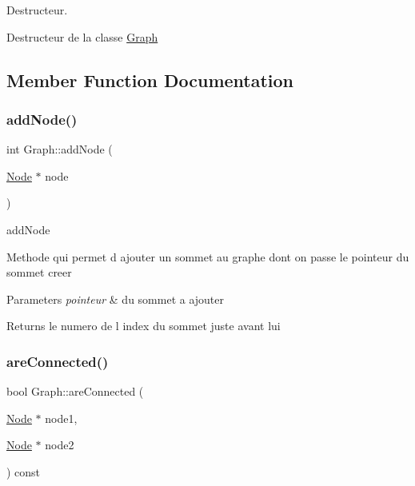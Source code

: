 Destructeur. 

Destructeur de la classe \mbox{\hyperlink{class_graph}{Graph}} 

\subsection{Member Function Documentation}
\mbox{\label{class_graph_a8236fc82b90fdea9b07d4cd0ae189925}} 
\subsubsection{\texorpdfstring{add\+Node()}{addNode()}}
{\footnotesize\ttfamily int Graph\+::add\+Node (\begin{DoxyParamCaption}\item[{\mbox{\hyperlink{class_node}{Node}} $\ast$}]{node }\end{DoxyParamCaption})}



add\+Node 

Methode qui permet d ajouter un sommet au graphe dont on passe le pointeur du sommet creer


\begin{DoxyParams}{Parameters}
{\em pointeur} & du sommet a ajouter\\
\hline
\end{DoxyParams}
\begin{DoxyReturn}{Returns}
le numero de l index du sommet juste avant lui 
\end{DoxyReturn}
\mbox{\label{class_graph_af392b6a490dee43fb2448b2d969353b0}} 
\subsubsection{\texorpdfstring{are\+Connected()}{areConnected()}}
{\footnotesize\ttfamily bool Graph\+::are\+Connected (\begin{DoxyParamCaption}\item[{\mbox{\hyperlink{class_node}{Node}} $\ast$}]{node1,  }\item[{\mbox{\hyperlink{class_node}{Node}} $\ast$}]{node2 }\end{DoxyParamCaption}) const}



